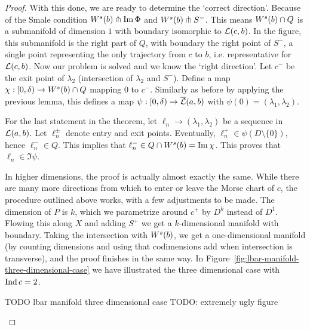 \begin{proof}
    With this done, we are ready to determine the `correct direction'.
    Because of the Smale condition $W^s(b) \pitchfork \operatorname{Im} \Phi$ and  $W^s(b) \pitchfork S^{-}$.
    This means $W^s(b) \cap Q$ is a submanifold of dimension $1$ with boundary isomorphic to $\mathcal L(c, b)$.
    In the figure, this submanifold is the right part of $Q$, with boundary the right point of $S^{-}$, a single point representing the only trajectory from $c$ to $b$, i.e. representative for $\mathcal L(c, b)$.
    Now our problem is solved and we know the `right direction'.
    Let $c^{-}$ be the exit point of $\lambda_2$ (intersection of $\lambda_2$ and $S^{-}$). 
    Define a map $\chi:[0, \delta) \to  W^s(b) \cap  Q$ mapping $0$ to  $c^{-}$.
    Similarly as before by applying the previous lemma, this defines a map $\psi: [0, \delta) \to  \overline{\mathcal L}(a, b)$ with $\psi(0) = (\lambda_1, \lambda_2)$.

    For the last statement in the theorem, let $\ell_n \to  (\lambda_1, \lambda_2)$ be a sequence in $\mathcal L(a, b)$. Let $ \ell^{\pm}_n$ denote entry and exit points. 
    Eventually, $\ell_n^{+} \in \psi(D \setminus \{0\})$, hence $ \ell_n^{-} \in Q$. This implies that $ \ell_n^{-} \in Q \cap W^s(b) = \operatorname{Im} \chi$.
    This proves that $ \ell_n \in \Im \psi$.

    In higher dimensions, the proof is actually almost exactly the same.
    While there are many more directions from which to enter or leave the Morse chart of $c$, the procedure outlined above works, with a few adjustments to be made.
    The dimension of $P$ is $k$, which we parametrize around $c^{+}$ by $D^{k}$ instead of $D^{1}$. Flowing this along $X$ and adding $S^{+}$ we get a $k$-dimensional manifold with boundary. Taking the intersection with  $W^s(b)$, we get a one-dimensional manifold (by counting dimensions and using that codimensions add when intersection is transverse), and the proof finishes in the same way.
    In Figure~\ref{fig:lbar-manifold-three-dimensional-case} we have illustrated the three dimensional case with $\operatorname{Ind} c=2$.

\begin{marginfigure}
    \centering
    \caption{TODO lbar manifold three dimensional case TODO: extremely ugly figure}
    \label{fig:lbar-manifold-three-dimensional-case}
\end{marginfigure}
\end{proof}
